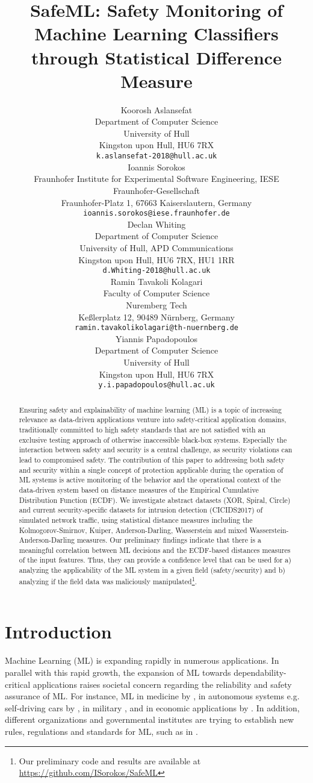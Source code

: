 \documentclass{article}
\title{SafeML: Safety Monitoring of Machine Learning Classifiers through Statistical Difference Measure}
\author{
  Koorosh Aslansefat\\
Department of Computer Science\\
  University of Hull\\
  Kingston upon Hull, HU6 7RX \\
  \texttt{k.aslansefat-2018@hull.ac.uk} \\
\And
    Ioannis Sorokos \\
  Fraunhofer Institute for Experimental Software Engineering, IESE\\
  Fraunhofer-Gesellschaft\\
  Fraunhofer-Platz 1, 67663 Kaiserslautern, Germany \\
  \texttt{ioannis.sorokos@iese.fraunhofer.de} \\
     \And
    Declan Whiting \\
    Department of Computer Science\\
    University of Hull, APD Communications\\
    Kingston upon Hull, HU6 7RX, HU1 1RR \\
    \texttt{d.Whiting-2018@hull.ac.uk} \\
       \And
    Ramin Tavakoli Kolagari \\
    Faculty of Computer Science\\
    Nuremberg Tech\\
    Keßlerplatz 12, 90489 Nürnberg, Germany\\
    \texttt{ramin.tavakolikolagari@th-nuernberg.de} \\
         \And
    Yiannis Papadopoulos \\
    Department of Computer Science\\
    University of Hull\\
    Kingston upon Hull, HU6 7RX \\
    \texttt{y.i.papadopoulos@hull.ac.uk} \\
}
\begin{document}
\maketitle

\begin{abstract}
Ensuring safety and explainability of machine learning (ML) is a topic of increasing relevance as data-driven applications venture into safety-critical application domains, traditionally committed to high safety standards that are not satisfied with an exclusive testing approach of otherwise inaccessible black-box systems. Especially the interaction between safety and security is a central challenge, as security violations can lead to compromised safety. The contribution of this paper to addressing both safety and security within a single concept of protection applicable during the operation of ML systems is active monitoring of the behavior and the operational context of the data-driven system based on distance measures of the Empirical Cumulative Distribution Function (ECDF). We investigate abstract datasets (XOR, Spiral, Circle) and current security-specific datasets for intrusion detection (CICIDS2017) of simulated network traffic, using statistical distance measures including the Kolmogorov-Smirnov, Kuiper, Anderson-Darling, Wasserstein and mixed Wasserstein-Anderson-Darling measures. Our preliminary findings indicate that there is a meaningful correlation between ML decisions and the ECDF-based distances measures of the input features. Thus, they can provide a confidence level
that can be used for a) analyzing the applicability of the ML system in a given field (safety/security) and b) analyzing if the field data was maliciously manipulated\footnote{Our preliminary code and results are available at \href{https://github.com/ISorokos/SafeML}{https://github.com/ISorokos/SafeML}}.

\end{abstract}
\section{Introduction} \label{section-introduction}
Machine Learning (ML) is expanding rapidly in numerous applications. In parallel with this rapid growth, the expansion of ML towards dependability-critical applications raises societal concern regarding the reliability and safety assurance of ML. For instance, ML in medicine by \cite{begoli2019need,wiens2019no,qayyum2020secure}, in autonomous systems e.g. self-driving cars by \cite{burton2020mind,du2020ai}, in military \cite{sharkey2019autonomous}, and in economic applications by \cite{Davenport2019}. In addition, different organizations and governmental institutes are trying to establish new rules, regulations and standards for ML, such as in \cite{ISO_AI,UK_GOV,alexander2020safety}.
\end{document}
